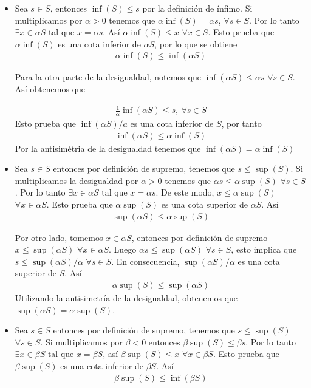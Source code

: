 \documentclass[12pt]{book}
\begin{document}
\begin{itemize}
    \item[\textbf{a)}] Sea $s \in S$, entonces $\inf(S)\leq s$ por la definición de ínfimo. Si multiplicamos por $\alpha >0$ tenemos que 
$\alpha\inf(S)=\alpha s$, $\forall s \in S$. Por lo tanto $\exists x \in \alpha S$ tal que $x=\alpha s$. Así $\alpha \inf(S)\leq x$ $\forall x \in S$. Esto prueba que $\alpha \inf(S)$ es una cota inferior de $\alpha S$, por lo que se obtiene
\begin{align*}
    \alpha \inf(S) \leq \inf(\alpha S)
\end{align*}

Para la otra parte de la desigualdad, notemos que $\inf(\alpha S) \leq \alpha s$ $ \forall s \in S$. Así obtenemos que 

\begin{align*}
    \frac{1}{\alpha}\inf(\alpha S)\leq s, \ \forall s \in S
\end{align*}
Esto prueba que $\inf(\alpha S)/a$ es una cota inferior de $S$, por tanto 
\begin{align*}
    \inf(\alpha S )\leq \alpha \inf(S)
\end{align*}
Por la antisimétria de la desigualdad tenemos que $\inf(\alpha S)=\alpha\inf(S)$
\item[\textbf{b)}] Sea $s \in S$ entonces por definición de supremo, tenemos que $s \leq \sup(S)$. Si multiplicamos la desigualdad por $\alpha>0$ tenemos que $\alpha s \leq \alpha \sup(S)$ $\forall s \in S$. Por lo tanto $\exists x \in \alpha S$ tal que $x=\alpha s$. De este modo, $x \leq \alpha \sup(S)$ $\forall x\in \alpha S$. Esto prueba que $\alpha \sup(S)$ es una cota superior de $\alpha S$. Así 
\begin{align*}
    \sup(\alpha S) \leq \alpha \sup(S)
\end{align*}

Por otro lado, tomemos $x \in \alpha S$, entonces por definición de supremo $x \leq \sup(\alpha S)$ $\forall x \in \alpha S$. Luego $\alpha s\leq \sup(\alpha S)$ $\forall s \in S$, esto implica que $s \leq \sup(\alpha S)/\alpha$ $\forall s \in S$. En consecuencia, $\sup(\alpha S)/\alpha$ es una cota superior de $S$. Así 
\begin{align*}
    \alpha\sup(S) \leq \sup(\alpha S)
\end{align*}
Utilizando la antisimetría de la desigualdad, obtenemos que $\sup(\alpha S)=\alpha\sup(S)$.

\item[\textbf{c)}] Sea $s \in S$ entonces por definición de supremo, tenemos que $s \leq \sup(S)$ $ \forall s \in S$. Si multiplicamos por $\beta <0$ entonces $\beta \sup(S) \leq \beta s$. Por lo tanto $\exists x \in \beta S$ tal que $x=\beta S$, así $\beta \sup(S) \leq x$ $\forall x \in \beta S$. Esto prueba que $\beta \sup(S)$ es una cota inferior de $\beta S$. Así
\begin{align*}
    \beta\sup(S)\leq \inf(\beta S)
\end{align*}


\end{itemize}
\end{document}
